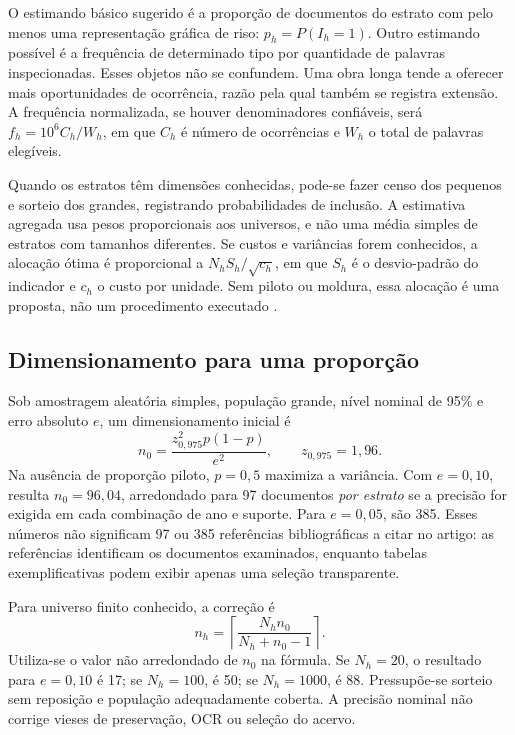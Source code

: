 O estimando básico sugerido é a proporção de documentos do estrato com pelo menos uma representação gráfica de riso: $p_h=P(I_h=1)$. Outro estimando possível é a frequência de determinado tipo por quantidade de palavras inspecionadas. Esses objetos não se confundem. Uma obra longa tende a oferecer mais oportunidades de ocorrência, razão pela qual também se registra extensão. A frequência normalizada, se houver denominadores confiáveis, será $f_h=10^6 C_h/W_h$, em que $C_h$ é número de ocorrências e $W_h$ o total de palavras elegíveis.

Quando os estratos têm dimensões conhecidas, pode-se fazer censo dos pequenos e sorteio dos grandes, registrando probabilidades de inclusão. A estimativa agregada usa pesos proporcionais aos universos, e não uma média simples de estratos com tamanhos diferentes. Se custos e variâncias forem conhecidos, a alocação ótima é proporcional a $N_hS_h/\sqrt{c_h}$, em que $S_h$ é o desvio-padrão do indicador e $c_h$ o custo por unidade. Sem piloto ou moldura, essa alocação é uma proposta, não um procedimento executado \cite{cochran1977}.

\subsection{Dimensionamento para uma proporção}
Sob amostragem aleatória simples, população grande, nível nominal de 95\% e erro absoluto $e$, um dimensionamento inicial é
\begin{equation}
n_0=\frac{z_{0,975}^2p(1-p)}{e^2},\qquad z_{0,975}=1{,}96.
\end{equation}
Na ausência de proporção piloto, $p=0{,}5$ maximiza a variância. Com $e=0{,}10$, resulta $n_0=96{,}04$, arredondado para 97 documentos \emph{por estrato} se a precisão for exigida em cada combinação de ano e suporte. Para $e=0{,}05$, são 385. Esses números não significam 97 ou 385 referências bibliográficas a citar no artigo: as referências identificam os documentos examinados, enquanto tabelas exemplificativas podem exibir apenas uma seleção transparente.

Para universo finito conhecido, a correção é
\begin{equation}
n_h=\left\lceil\frac{N_hn_0}{N_h+n_0-1}\right\rceil.
\end{equation}
Utiliza-se o valor não arredondado de $n_0$ na fórmula. Se $N_h=20$, o resultado para $e=0{,}10$ é 17; se $N_h=100$, é 50; se $N_h=1000$, é 88. Pressupõe-se sorteio sem reposição e população adequadamente coberta. A precisão nominal não corrige vieses de preservação, OCR ou seleção do acervo.

